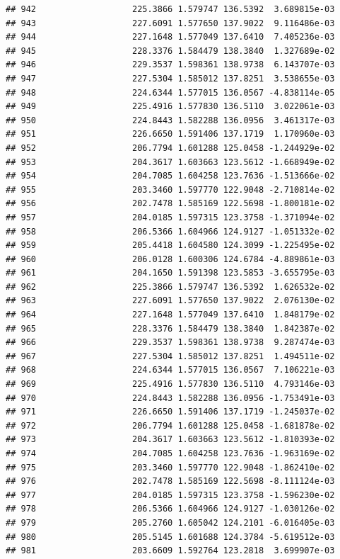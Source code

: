 \documentclass[
]{article}
\begin{document}
\begin{verbatim}
## 942                   225.3866 1.579747 136.5392  3.689815e-03
## 943                   227.6091 1.577650 137.9022  9.116486e-03
## 944                   227.1648 1.577049 137.6410  7.405236e-03
## 945                   228.3376 1.584479 138.3840  1.327689e-02
## 946                   229.3537 1.598361 138.9738  6.143707e-03
## 947                   227.5304 1.585012 137.8251  3.538655e-03
## 948                   224.6344 1.577015 136.0567 -4.838114e-05
## 949                   225.4916 1.577830 136.5110  3.022061e-03
## 950                   224.8443 1.582288 136.0956  3.461317e-03
## 951                   226.6650 1.591406 137.1719  1.170960e-03
## 952                   206.7794 1.601288 125.0458 -1.244929e-02
## 953                   204.3617 1.603663 123.5612 -1.668949e-02
## 954                   204.7085 1.604258 123.7636 -1.513666e-02
## 955                   203.3460 1.597770 122.9048 -2.710814e-02
## 956                   202.7478 1.585169 122.5698 -1.800181e-02
## 957                   204.0185 1.597315 123.3758 -1.371094e-02
## 958                   206.5366 1.604966 124.9127 -1.051332e-02
## 959                   205.4418 1.604580 124.3099 -1.225495e-02
## 960                   206.0128 1.600306 124.6784 -4.889861e-03
## 961                   204.1650 1.591398 123.5853 -3.655795e-03
## 962                   225.3866 1.579747 136.5392  1.626532e-02
## 963                   227.6091 1.577650 137.9022  2.076130e-02
## 964                   227.1648 1.577049 137.6410  1.848179e-02
## 965                   228.3376 1.584479 138.3840  1.842387e-02
## 966                   229.3537 1.598361 138.9738  9.287474e-03
## 967                   227.5304 1.585012 137.8251  1.494511e-02
## 968                   224.6344 1.577015 136.0567  7.106221e-03
## 969                   225.4916 1.577830 136.5110  4.793146e-03
## 970                   224.8443 1.582288 136.0956 -1.753491e-03
## 971                   226.6650 1.591406 137.1719 -1.245037e-02
## 972                   206.7794 1.601288 125.0458 -1.681878e-02
## 973                   204.3617 1.603663 123.5612 -1.810393e-02
## 974                   204.7085 1.604258 123.7636 -1.963169e-02
## 975                   203.3460 1.597770 122.9048 -1.862410e-02
## 976                   202.7478 1.585169 122.5698 -8.111124e-03
## 977                   204.0185 1.597315 123.3758 -1.596230e-02
## 978                   206.5366 1.604966 124.9127 -1.030126e-02
## 979                   205.2760 1.605042 124.2101 -6.016405e-03
## 980                   205.5145 1.601688 124.3784 -5.619512e-03
## 981                   203.6609 1.592764 123.2818  3.699907e-03

\end{verbatim}
\end{document}
